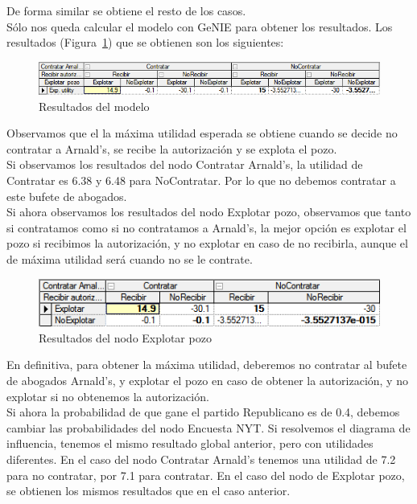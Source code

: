 \documentclass[12pt,a4paper,openright,final]{article}
\begin{document}
De forma similar se obtiene el resto de los casos.\\

Sólo nos queda calcular el modelo con GeNIE para obtener los resultados. Los resultados (Figura~\ref{fig:resultado}) que se obtienen son los siguientes:\\

\begin{figure}[tbph!]
	\centering
	\includegraphics[width=\linewidth]{imagenes/resultado.png}
	\caption{Resultados del modelo}
	\label{fig:resultado}
\end{figure}

Observamos que el la máxima utilidad esperada se obtiene cuando se decide no contratar a Arnald's, se recibe la autorización y se explota el pozo.\\

Si observamos los resultados del nodo Contratar Arnald's, la utilidad de Contratar es 6.38 y 6.48 para NoContratar. Por lo que no debemos contratar a este bufete de abogados.\\

Si ahora observamos los resultados del nodo Explotar pozo, observamos que tanto si contratamos como si no contratamos a Arnald's, la mejor opción es explotar el pozo si recibimos la autorización, y no explotar en caso de no recibirla, aunque el de máxima utilidad será cuando no se le contrate.\\

\begin{figure}[tbph!]
	\centering
	\includegraphics[width=\linewidth]{imagenes/resultados_pozo.png}
	\caption{Resultados del nodo Explotar pozo}
	\label{fig:resultados_pozo}
\end{figure}

En definitiva, para obtener la máxima utilidad, deberemos no contratar al bufete de abogados Arnald's, y explotar el pozo en caso de obtener la autorización, y no explotar si no obtenemos la autorización.\\

Si ahora la probabilidad de que gane el partido Republicano es de 0.4, debemos cambiar las probabilidades del nodo Encuesta NYT. Si resolvemos el diagrama de influencia, tenemos el mismo resultado global anterior, pero con utilidades diferentes. En el caso del nodo Contratar Arnald's tenemos una utilidad de 7.2 para no contratar, por 7.1 para contratar. En el caso del nodo de Explotar pozo, se obtienen los mismos resultados que en el caso anterior.\\
\end{document}
